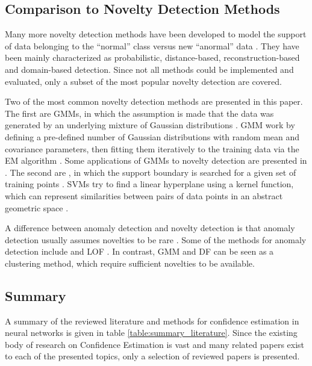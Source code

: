 \documentclass[10pt]{article}
\begin{document}
\subsection{Comparison to Novelty Detection Methods}
Many more novelty detection methods have been developed to model the support of data belonging to the ``normal'' class versus new ``anormal'' data \cite{Pimentel2014ARO, Markou2003NoveltyDApt1, Markou2003NoveltyDApt2}. They have been mainly characterized as probabilistic, distance-based, reconstruction-based and domain-based detection. Since not all methods could be implemented and evaluated, only a subset of the most popular novelty detection are covered. 

Two of the most common novelty detection methods are presented in this paper. The first are \glspl{GMM}, in which the assumption is made that the data was generated by an underlying mixture of Gaussian distributions \cite{Reynolds2009GaussianMM}. \gls{GMM} work by defining a pre-defined number of Gaussian distributions with random mean and covariance parameters, then fitting them iteratively to the training data via the \gls{EM} algorithm \cite{Dempster1977MaximumLF}. Some applications of \glspl{GMM} to novelty detection are presented in \cite{Pimentel2014ARO}. The second are , in which the support boundary is searched for a given set of training points \cite{Wang2004AnomalyID, Beghi2014AOS}. \glspl{SVM} try to find a linear hyperplane using a kernel function, which can represent similarities between pairs of data points in an abstract geometric space \cite{Szymanski2011VisualisingKS}.

A difference between anomaly detection and novelty detection is that anomaly detection usually assumes novelties to be rare \cite{deMorsier2014thesis}. Some of the methods for anomaly detection include  and \acrfull{LOF} \cite{Pimentel2014ARO, Breunig2000LOFID, Liu2008IsolationF}. In contrast, \gls{GMM} and \gls{DF} can be seen as a clustering method, which require sufficient novelties to be available.

\subsection{Summary}
A summary of the reviewed literature and methods for confidence estimation in neural networks is given in table \ref{table:summary_literature}. Since the existing body of research on Confidence Estimation is vast and many related papers exist to each of the presented topics, only a selection of reviewed papers is presented.
\end{document}
